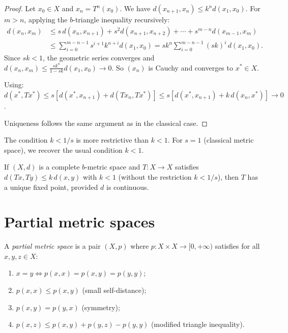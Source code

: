 \begin{proof}
Let $x_0 \in X$ and $x_n = T^n(x_0)$. We have $d(x_{n+1}, x_n) \leq k^n d(x_1, x_0)$.
For $m > n$, applying the $b$-triangle inequality recursively:
\begin{align*}
    d(x_n, x_m) &\leq s \, d(x_n, x_{n+1}) + s^2 d(x_{n+1}, x_{n+2}) + \cdots + s^{m-n} d(x_{m-1}, x_m) \\
    &\leq \sum_{i=0}^{m-n-1} s^{i+1} k^{n+i} d(x_1, x_0)
    = s k^n \sum_{i=0}^{m-n-1} (sk)^i \, d(x_1, x_0).
\end{align*}
Since $sk < 1$, the geometric series converges and
$d(x_n, x_m) \leq \frac{sk^n}{1 - sk} d(x_1, x_0) \to 0$.
So $(x_n)$ is Cauchy and converges to $x^* \in X$.

Using: $d(x^*, Tx^*) \leq s[d(x^*, x_{n+1}) + d(Tx_n, Tx^*)]
\leq s[d(x^*, x_{n+1}) + k \, d(x_n, x^*)] \to 0$.

Uniqueness follows the same argument as in the classical case.
\end{proof}

\begin{remark}
The condition $k < 1/s$ is more restrictive than $k < 1$. For $s = 1$ (classical
metric space), we recover the usual condition $k < 1$.
\end{remark}

\begin{theorem}
If $(X, d)$ is a complete $b$-metric space and $T : X \to X$ satisfies
$d(Tx, Ty) \leq k \, d(x, y)$ with $k < 1$ (without the restriction $k < 1/s$),
then $T$ has a unique fixed point, provided $d$ is continuous.
\end{theorem}

\section{Partial metric spaces}

\begin{definition}
A \emph{partial metric space} is a pair $(X, p)$ where
$p : X \times X \to [0, +\infty)$ satisfies for all $x, y, z \in X$:
\begin{enumerate}
    \item $x = y \Leftrightarrow p(x, x) = p(x, y) = p(y, y)$;
    \item $p(x, x) \leq p(x, y)$ \quad (small self-distance);
    \item $p(x, y) = p(y, x)$ \quad (symmetry);
    \item $p(x, z) \leq p(x, y) + p(y, z) - p(y, y)$ \quad (modified triangle inequality).
\end{enumerate}
\end{definition}

